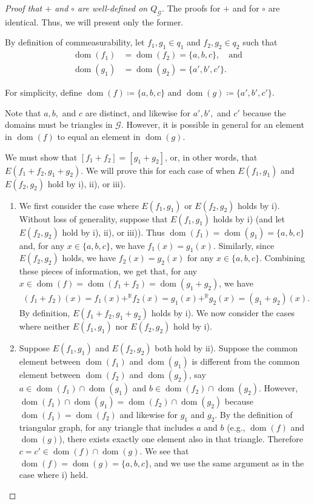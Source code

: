 \documentclass{scrartcl}
\DeclareMathOperator{\dom}{dom}
\newcommand{\SG}{\mathscr{G}}
\newcommand{\BR}{\mathbb{R}}
\begin{document}
\begin{proof}[Proof that $+$ and $\circ$ are well-defined on $Q_{\SG}$] The proofs for $+$ and for $\circ$ are identical. Thus, we will present only the former. 

By definition of commeasurability, let $f_1,g_1\in q_1$ and $f_2,g_2\in q_2$ such that
\begin{align*}
\dom(f_1)&=\dom(f_2)=\{a,b,c\},\quad\text{and}\\
\dom(g_1)&=\dom(g_2)=\{a',b',c'\}.
\end{align*}

For simplicity, define $\dom(f)\coloneq\{a,b,c\}$ and $\dom(g)\coloneq\{a',b',c'\}$.

Note that $a,b,$ and $c$ are distinct, and likewise for $a',b',$ and $c'$ because the domains must be triangles in $\SG$. However, it is possible in general for an element in $\dom(f)$ to equal an element in $\dom(g)$.

We must show that $[f_1+f_2]=[g_1+g_2]$, or, in other words, that $E(f_1+ f_2,g_1+ g_2)$. We will prove this for each case of when $E(f_1,g_1)$ and $E(f_2,g_2)$ hold by i), ii), or iii).

\begin{enumerate}[(1)]

\item We first consider the case where $E(f_1,g_1)$ or $E(f_2,g_2)$ holds by i). Without loss of generality, suppose that $E(f_1,g_1)$ holds by i) (and let $E(f_2,g_2)$ hold by i), ii), or iii)). Thus $\dom(f_1)=\dom(g_1)=\{a,b,c\}$ and, for any $x\in\{a,b,c\}$, we have $f_1(x)=g_1(x)$. Similarly, since $E(f_2,g_2)$ holds, we have $f_2(x)=g_2(x)$ for any $x\in\{a,b,c\}$. Combining these pieces of information, we get that, for any $x\in\dom(f)=\dom(f_1+f_2)=\dom(g_1+g_2)$, we have
\begin{align*}
(f_1+f_2)(x)=f_1(x)+^{\BR}f_2(x)=g_1(x)+^{\BR}g_2(x)=(g_1+g_2)(x).
\end{align*}
By definition, $E(f_1+f_2,g_1+g_2)$ holds by i). We now consider the cases where neither $E(f_1,g_1)$ nor $E(f_2,g_2)$ hold by i).

\item Suppose $E(f_1,g_1)$ and $E(f_2,g_2)$ both hold by ii). Suppose the common element between $\dom(f_1)$ and $\dom(g_1)$ is different from the common element between $\dom(f_2)$ and $\dom(g_2)$, say $a\in\dom(f_1)\cap\dom(g_1)$ and $b\in\dom(f_2)\cap\dom(g_2)$. However, $\dom(f_1)\cap\dom(g_1)=\dom(f_2)\cap\dom(g_2)$ because $\dom(f_1)=\dom(f_2)$ and likewise for $g_1$ and $g_2$. By the definition of triangular graph, for any triangle that includes $a$ and $b$ (e.g., $\dom(f)$ and $\dom(g)$), there exists exactly one element also in that triangle. Therefore $c=c'\in\dom(f)\cap\dom(g)$. We see that $\dom(f)=\dom(g)=\{a,b,c\}$, and we use the same argument as in the case where i) held.


\end{enumerate}
\end{proof}
\end{document}
